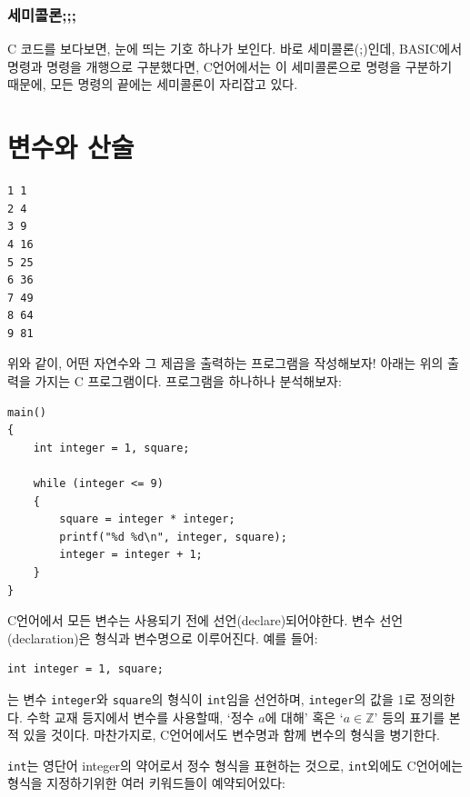 \documentclass[a4paper,12pt]{book}
\newcommand{\V}[1]{\Verb|#1|}
\begin{document}

\subsubsection{세미콜론;;;}

C 코드를 보다보면, 눈에 띄는 기호 하나가 보인다.
바로 세미콜론(;)인데, BASIC에서 명령과 명령을 개행으로 구분했다면,
C언어에서는 이 세미콜론으로 명령을 구분하기 때문에,
모든 명령의 끝에는 세미콜론이 자리잡고 있다.


\section{변수와 산술}

\begin{lstlisting}
1 1
2 4
3 9
4 16
5 25
6 36
7 49
8 64
9 81
\end{lstlisting}

위와 같이, 어떤 자연수와 그 제곱을 출력하는 프로그램을 작성해보자!
아래는 위의 출력을 가지는 C 프로그램이다.
프로그램을 하나하나 분석해보자:

\begin{lstlisting}
main()
{
    int integer = 1, square;

    while (integer <= 9)
    {
        square = integer * integer;
        printf("%d %d\n", integer, square);
        integer = integer + 1;
    }
}
\end{lstlisting}

C언어에서 모든 변수는 사용되기 전에 선언(declare)되어야한다.
변수 선언(declaration)은 형식과 변수명으로 이루어진다.
예를 들어:

\begin{lstlisting}
int integer = 1, square;
\end{lstlisting}

는 변수 \V{integer}와 \V{square}의 형식이 \V{int}임을 선언하며,
\V{integer}의 값을 1로 정의한다.
수학 교재 등지에서 변수를 사용할때,
`정수 $a$에 대해' 혹은 `$a \in \mathbb{Z}$' 등의 표기를 본 적 있을 것이다.
마찬가지로, C언어에서도 변수명과 함께 변수의 형식을 병기한다.

\V{int}는 영단어 integer의 약어로서 정수 형식을 표현하는 것으로,
\V{int}외에도 C언어에는 형식을 지정하기위한 여러 키워드들이 예약되어있다:
\end{document}
